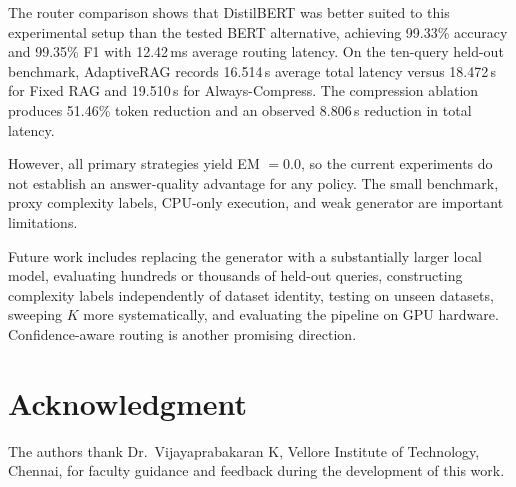 \documentclass[conference]{IEEEtran}
\begin{document}
The router comparison shows that DistilBERT was better suited to this experimental setup than the tested BERT alternative, achieving 99.33\% accuracy and 99.35\% F1 with 12.42\,ms average routing latency. On the ten-query held-out benchmark, AdaptiveRAG records 16.514\,s average total latency versus 18.472\,s for Fixed RAG and 19.510\,s for Always-Compress. The compression ablation produces 51.46\% token reduction and an observed 8.806\,s reduction in total latency.

However, all primary strategies yield EM $=0.0$, so the current experiments do not establish an answer-quality advantage for any policy. The small benchmark, proxy complexity labels, CPU-only execution, and weak generator are important limitations.

Future work includes replacing the generator with a substantially larger local model, evaluating hundreds or thousands of held-out queries, constructing complexity labels independently of dataset identity, testing on unseen datasets, sweeping $K$ more systematically, and evaluating the pipeline on GPU hardware. Confidence-aware routing is another promising direction.

\section*{Acknowledgment}
The authors thank Dr.\ Vijayaprabakaran K, Vellore Institute of Technology, Chennai, for faculty guidance and feedback during the development of this work.



\end{document}
